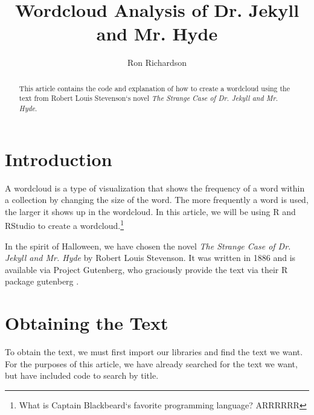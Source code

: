 \documentclass{article}\usepackage[]{graphicx}\usepackage[]{color}
\begin{document}
\title{Wordcloud Analysis of Dr. Jekyll and Mr. Hyde}
\author{Ron Richardson}
\maketitle

\begin{abstract}
This article contains the code and explanation of how to create a wordcloud using the text from Robert Louis Stevenson`s novel \textit{The Strange Case of Dr. Jekyll and Mr. Hyde}.
\end{abstract}

\section{Introduction}
A wordcloud is a type of visualization that shows the frequency of a word within a collection by changing the size of the word. The more frequently a word is used, the larger it shows up in the wordcloud.  In this article, we will be using R and RStudio to create a wordcloud.\footnote{What is Captain Blackbeard`s favorite programming language?  ARRRRRR}

In the spirit of Halloween, we have chosen the novel \textit{The Strange Case of Dr. Jekyll and Mr. Hyde} by Robert Louis Stevenson. It was written in 1886 and is available via Project Gutenberg, who graciously provide the text via their R package gutenberg \citep{Gutenberg}.

\section{Obtaining the Text}
To obtain the text, we must first import our libraries and find the text we want. For the purposes of this article, we have already searched for the text we want, but have included code to search by title.
\end{document}
